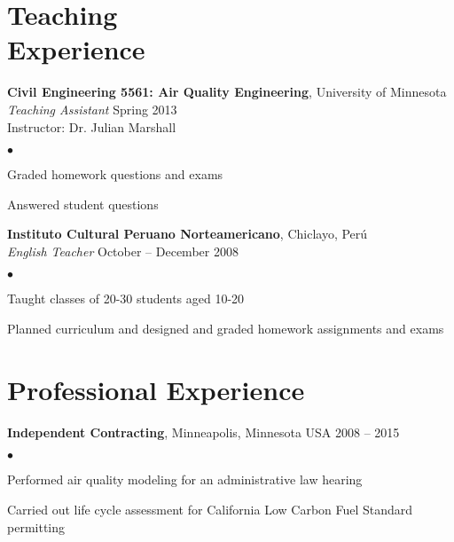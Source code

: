 \documentclass[margin,line,10pt]{res}
\newenvironment{list2}{
  \begin{list}{$\bullet$}{%
      \setlength{\itemsep}{0in}
      \setlength{\parsep}{0in} \setlength{\parskip}{0in}
      \setlength{\topsep}{0in} \setlength{\partopsep}{0in}
      \setlength{\leftmargin}{0.2in}}}{\end{list}}
\begin{document}
\begin{resume}


\vspace*{-.1in}



\section{\sc Teaching\\Experience}

{\bf Civil Engineering 5561: Air Quality Engineering}, University of Minnesota\\
{\em Teaching Assistant} \hfill Spring 2013\\
\vspace{-.3cm}
Instructor: Dr. Julian Marshall\\
\begin{list2}
\item Graded homework questions and exams
\item Answered student questions
\end{list2}

\vspace*{-.1in}

{\bf Instituto Cultural Peruano Norteamericano}, Chiclayo, Per\'{u}\\
\vspace{-.3cm}
{\em English Teacher} \hfill October -- December 2008\\
\begin{list2}
\item Taught classes of 20-30 students aged 10-20
\item Planned curriculum and designed and graded homework assignments and exams
\end{list2}

\vspace*{-.1in}

\section{\sc Professional Experience}

{\bf Independent Contracting}, Minneapolis, Minnesota USA \hfill 2008 -- 2015\\
\vspace*{-.1in}
\begin{list2}
\item Performed air quality modeling for an administrative law hearing
\item Carried out life cycle assessment for California Low Carbon Fuel Standard permitting



\end{list2}
\end{resume}
\end{document}
